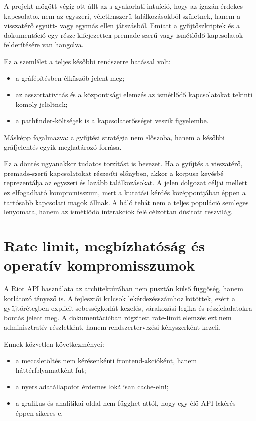 ﻿\documentclass[a4paper,12pt]{report}
\begin{document}
A projekt mögött végig ott állt az a gyakorlati intuíció, hogy az igazán érdekes kapcsolatok nem az egyszeri, véletlenszerű találkozásokból születnek, hanem a visszatérő együtt- vagy egymás ellen játszásból. Emiatt a gyűjtőszkriptek és a dokumentáció egy része kifejezetten premade-szerű vagy ismétlődő kapcsolatok felderítésére van hangolva.

Ez a szemlélet a teljes későbbi rendszerre hatással volt:

\begin{itemize}
    \item a gráfépítésben élküszöb jelent meg;
    \item az asszortativitás és a központisági elemzés az ismétlődő kapcsolatokat tekinti komoly jelöltnek;
    \item a pathfinder-költségek is a kapcsolaterősséget veszik figyelembe.
\end{itemize}

Másképp fogalmazva: a gyűjtési stratégia nem előszoba, hanem a későbbi gráfjelentés egyik meghatározó forrása.

Ez a döntés ugyanakkor tudatos torzítást is bevezet. Ha a gyűjtés a visszatérő, premade-szerű kapcsolatokat részesíti előnyben, akkor a korpusz kevésbé reprezentálja az egyszeri és lazább találkozásokat. A jelen dolgozat céljai mellett ez elfogadható kompromisszum, mert a kutatási kérdés középpontjában éppen a tartósabb kapcsolati magok állnak. A háló tehát nem a teljes populáció semleges lenyomata, hanem az ismétlődő interakciók felé célzottan dúsított részvilág.

\section{Rate limit, megbízhatóság és operatív kompromisszumok}

A Riot API használata az architektúrában nem pusztán külső függőség, hanem korlátozó tényező is. A fejlesztői kulcsok lekérdezésszámhoz kötöttek, ezért a gyűjtőrétegben explicit sebességkorlát-kezelés, várakozási logika és részfeladatokra bontás jelent meg. A dokumentációban rögzített rate-limit elemzés ezt nem adminisztratív részletként, hanem rendszertervezési kényszerként kezeli.

Ennek közvetlen következményei:

\begin{itemize}
    \item a meccsletöltés nem kérésenkénti frontend-akcióként, hanem háttérfolyamatként fut;
    \item a nyers adatállapotot érdemes lokálisan cache-elni;
    \item a grafikus és analitikai oldal nem függhet attól, hogy egy élő API-lekérés éppen sikeres-e.
\end{itemize}
\end{document}
